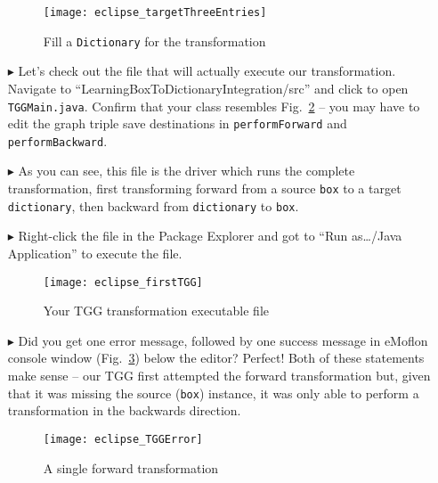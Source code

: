 \begin{itemize}
\vspace{0.5cm}

\begin{figure}[htbp]
\begin{center}
  \texttt{[image: eclipse\_targetThreeEntries]}
  \caption{Fill a \texttt{Dictionary} for the transformation}
  \label{eclipse:dictionaryxmi}
\end{center}
\end{figure}

\item[$\blacktriangleright$] Let's check out the file that will actually execute our transformation. Navigate to
``LearningBox\-To\-Dictionary\-In\-te\-gra\-tion\-/src'' and click to open \texttt{TGGMain.java}. Confirm that your class resembles Fig.~\ref{eclipse:firstTGG}
-- you may have to edit the graph triple save destinations in \texttt{performForward} and \texttt{performBackward}.

\item[$\blacktriangleright$] As you can see, this file is the driver which runs the complete transformation, first transforming forward from a
source \texttt{box} to a target \texttt{dictionary}, then backward from \texttt{dictionary} to \texttt{box}.

\item[$\blacktriangleright$] Right-click the file in the Package Explorer and got to ``Run as\ldots/Java Application'' to execute the file.

\begin{figure}[htbp]
\begin{center}
  \texttt{[image: eclipse\_firstTGG]}
  \caption{Your TGG transformation executable file}
  \label{eclipse:firstTGG}
\end{center}
\end{figure}

\newpage

\item[$\blacktriangleright$] Did you get one error message, followed by one success message in eMoflon console window (Fig.~\ref{eclipse:tggERROR}) below the
editor? Perfect! Both of these statements make sense -- our TGG first attempted the forward transformation but, given that it was missing the source
(\texttt{box}) instance, it was only able to perform a transformation in the backwards direction.

\vspace{0.5cm}

\begin{figure}[htbp]
\begin{center}
  \texttt{[image: eclipse\_TGGError]}
  \caption{A single forward transformation}
  \label{eclipse:tggERROR}
\end{center}
\end{figure}


\end{itemize}
